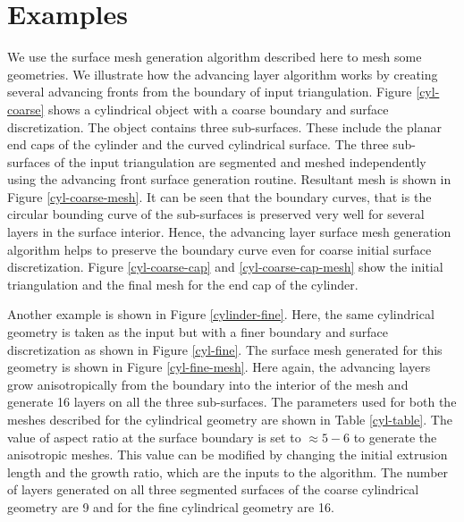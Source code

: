 \documentclass[conf]{new-aiaa}
\begin{document}
\section{Examples}

We use the surface mesh generation algorithm described here to mesh some geometries. We illustrate how the advancing layer algorithm works by creating several advancing fronts from the boundary of input triangulation. Figure \ref{cyl-coarse} shows a cylindrical object with a coarse boundary and surface discretization. The object contains three sub-surfaces. These include the planar end caps of the cylinder and the curved cylindrical surface. The three sub-surfaces of the input triangulation are segmented and meshed  independently using the advancing front surface generation routine. Resultant mesh is shown in Figure \ref{cyl-coarse-mesh}. It can be seen that the boundary curves, that is the circular bounding curve of the sub-surfaces is preserved very well for several layers in the surface interior. Hence, the advancing layer surface mesh generation algorithm helps to preserve the boundary curve even for coarse initial surface discretization. Figure \ref{cyl-coarse-cap} and \ref{cyl-coarse-cap-mesh} show the initial triangulation and the final mesh for the end cap of the cylinder. 

Another example is shown in Figure \ref{cylinder-fine}. Here, the same cylindrical geometry is taken as the input but with a finer boundary and surface discretization as shown in Figure \ref{cyl-fine}. The surface mesh generated for this geometry is shown in Figure \ref{cyl-fine-mesh}. Here again, the advancing layers grow anisotropically from the boundary into the interior of the mesh and generate 16 layers on all the three sub-surfaces. The parameters used for both the meshes described for the cylindrical geometry are shown in Table \ref{cyl-table}. The value of aspect ratio at the surface boundary is set to $\approx 5-6$ to generate the anisotropic meshes. This value can be modified by changing the initial extrusion length and the growth ratio, which are the inputs to the algorithm. The number of layers generated on all three segmented surfaces of the coarse cylindrical geometry are 9 and for the fine cylindrical geometry are 16.
\end{document}
